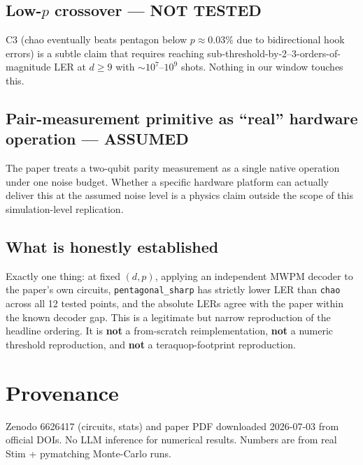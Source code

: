 \documentclass[11pt]{article}
\begin{document}
\subsection{Low-$p$ crossover --- NOT TESTED}
C3 (chao eventually beats pentagon below $p \approx 0.03\%$ due to
bidirectional hook errors) is a subtle claim that requires reaching
sub-threshold-by-2--3-orders-of-magnitude LER at $d \geq 9$ with $\sim$$10^7$--$10^9$
shots. Nothing in our window touches this.

\subsection{Pair-measurement primitive as ``real'' hardware operation --- ASSUMED}
The paper treats a two-qubit parity measurement as a single native operation
under one noise budget. Whether a specific hardware platform can actually
deliver this at the assumed noise level is a physics claim outside the
scope of this simulation-level replication.

\subsection{What is honestly established}
Exactly one thing: at fixed $(d,p)$, applying an independent MWPM decoder
to the paper's own circuits, \texttt{pentagonal\_sharp} has strictly lower
LER than \texttt{chao} across all 12 tested points, and the absolute LERs
agree with the paper within the known decoder gap. This is a legitimate but
narrow reproduction of the headline ordering. It is \textbf{not} a from-scratch
reimplementation, \textbf{not} a numeric threshold reproduction, and
\textbf{not} a teraquop-footprint reproduction.

\section{Provenance}
Zenodo 6626417 (circuits, stats) and paper PDF downloaded 2026-07-03 from
official DOIs. No LLM inference for numerical results. Numbers are from
real Stim + pymatching Monte-Carlo runs.


\end{document}
